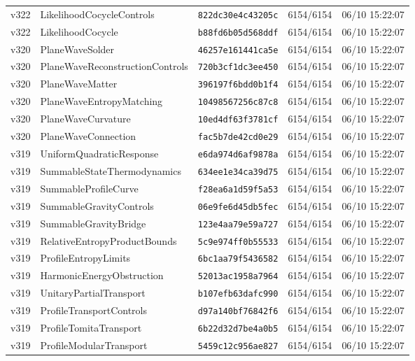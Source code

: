 \documentclass[11pt]{article}
\theoremstyle{definition}\newtheorem{deriv}{Derivation}
\begin{document}
{\begin{longtable}{@{}lllll@{}}
v322 & LikelihoodCocycleControls & \texttt{822dc30e4c43205c} & 6154/6154 & 06/10 15:22:07 \\
v322 & LikelihoodCocycle & \texttt{b88fd6b05d568ddf} & 6154/6154 & 06/10 15:22:07 \\
v320 & PlaneWaveSolder & \texttt{46257e161441ca5e} & 6154/6154 & 06/10 15:22:07 \\
v320 & PlaneWaveReconstructionControls & \texttt{720b3cf1dc3ee450} & 6154/6154 & 06/10 15:22:07 \\
v320 & PlaneWaveMatter & \texttt{396197f6bdd0b1f4} & 6154/6154 & 06/10 15:22:07 \\
v320 & PlaneWaveEntropyMatching & \texttt{10498567256c87c8} & 6154/6154 & 06/10 15:22:07 \\
v320 & PlaneWaveCurvature & \texttt{10ed4df63f3781cf} & 6154/6154 & 06/10 15:22:07 \\
v320 & PlaneWaveConnection & \texttt{fac5b7de42cd0e29} & 6154/6154 & 06/10 15:22:07 \\
v319 & UniformQuadraticResponse & \texttt{e6da974d6af9878a} & 6154/6154 & 06/10 15:22:07 \\
v319 & SummableStateThermodynamics & \texttt{634ee1e34ca39d75} & 6154/6154 & 06/10 15:22:07 \\
v319 & SummableProfileCurve & \texttt{f28ea6a1d59f5a53} & 6154/6154 & 06/10 15:22:07 \\
v319 & SummableGravityControls & \texttt{06e9fe6d45db5fec} & 6154/6154 & 06/10 15:22:07 \\
v319 & SummableGravityBridge & \texttt{123e4aa79e59a727} & 6154/6154 & 06/10 15:22:07 \\
v319 & RelativeEntropyProductBounds & \texttt{5c9e974ff0b55533} & 6154/6154 & 06/10 15:22:07 \\
v319 & ProfileEntropyLimits & \texttt{6bc1aa79f5436582} & 6154/6154 & 06/10 15:22:07 \\
v319 & HarmonicEnergyObstruction & \texttt{52013ac1958a7964} & 6154/6154 & 06/10 15:22:07 \\
v319 & UnitaryPartialTransport & \texttt{b107efb63dafc990} & 6154/6154 & 06/10 15:22:07 \\
v319 & ProfileTransportControls & \texttt{d97a140bf76842f6} & 6154/6154 & 06/10 15:22:07 \\
v319 & ProfileTomitaTransport & \texttt{6b22d32d7be4a0b5} & 6154/6154 & 06/10 15:22:07 \\
v319 & ProfileModularTransport & \texttt{5459c12c956ae827} & 6154/6154 & 06/10 15:22:07 \\

\end{longtable}}
\end{document}
